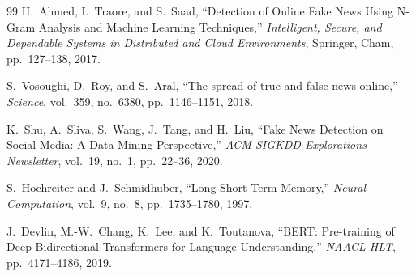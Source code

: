 \documentclass[11pt,a4paper]{article}
\begin{document}
\begin{thebibliography}{99}
H.~Ahmed, I.~Traore, and S.~Saad, ``Detection of Online Fake News Using N-Gram Analysis and Machine Learning Techniques,'' \textit{Intelligent, Secure, and Dependable Systems in Distributed and Cloud Environments}, Springer, Cham, pp.~127--138, 2017.

S.~Vosoughi, D.~Roy, and S.~Aral, ``The spread of true and false news online,'' \textit{Science}, vol.~359, no.~6380, pp.~1146--1151, 2018.

K.~Shu, A.~Sliva, S.~Wang, J.~Tang, and H.~Liu, ``Fake News Detection on Social Media: A Data Mining Perspective,'' \textit{ACM SIGKDD Explorations Newsletter}, vol.~19, no.~1, pp.~22--36, 2020.

S.~Hochreiter and J.~Schmidhuber, ``Long Short-Term Memory,'' \textit{Neural Computation}, vol.~9, no.~8, pp.~1735--1780, 1997.

J.~Devlin, M.-W.~Chang, K.~Lee, and K.~Toutanova, ``BERT: Pre-training of Deep Bidirectional Transformers for Language Understanding,'' \textit{NAACL-HLT}, pp.~4171--4186, 2019.
\end{thebibliography}
\end{document}
